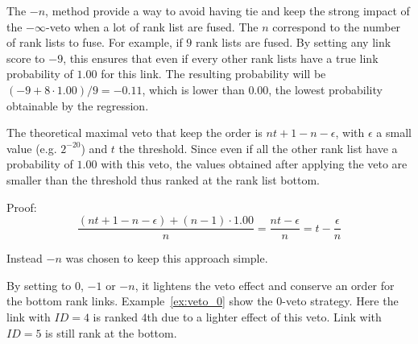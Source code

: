 The $-n$, method provide a way to avoid having tie and keep the strong impact of the $-\infty$-veto when a lot of rank list are fused.
The $n$ correspond to the number of rank lists to fuse.
For example, if $9$ rank lists are fused.
By setting any link score to $-9$, this ensures that even if every other rank lists have a true link probability of $1.00$ for this link.
The resulting probability will be $(-9 + 8 \cdot 1.00) / 9 = -0.11$, which is lower than $0.00$, the lowest probability obtainable by the regression.

The theoretical maximal veto that keep the order is $nt + 1 - n - \epsilon$, with $\epsilon$ a small value (e.g. $2^{-20}$) and $t$ the threshold.
Since even if all the other rank list have a probability of $1.00$ with this veto, the values obtained after applying the veto are smaller than the threshold thus ranked at the rank list bottom.

Proof:
$$\frac{(nt + 1 - n - \epsilon) + (n - 1) \cdot 1.00}{n} = \frac{nt - \epsilon}{n} = t - \frac{\epsilon}{n}$$

Instead $-n$ was chosen to keep this approach simple.

By setting to $0$, $-1$ or $-n$, it lightens the veto effect and conserve an order for the bottom rank links.
Example~\ref{ex:veto_0} show the $0$-veto strategy.
Here the link with $ID = 4$ is ranked $4$th due to a lighter effect of this veto.
Link with $ID = 5$ is still rank at the bottom.

